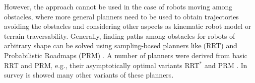 \documentclass[conference]{IEEEtran}
\newcommand{\revJ}[1]{\textcolor{red}{#1}}
\begin{document}
However, the approach cannot be used in the case of robots moving among obstacles, where more general planners need to be used to obtain trajectories avoiding the obstacles and considering other aspects as kinematic robot model or terrain traversability. Generally, ﬁnding paths among obstacles for robots of arbitrary shape can be solved using sampling-based planners like  (RRT) \cite{Mashayekhi2020} and Probabilistic Roadmaps (PRM) \cite{Xu2020}. A number of planners were derived from basic RRT and PRM, e.g., their asymptotically optimal variants RRT$^*$ and PRM \cite{Xu2020}. In survey \cite{Patle2019} is showed many other variants of these planners.

\end{document}
